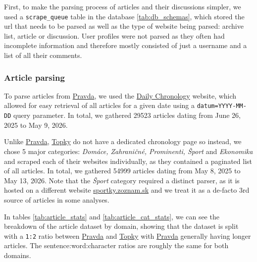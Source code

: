 \documentclass[11pt,a4paper]{article}
\def\topky{\href{https://topky.sk}{Topky}}
\def\pravda{\href{https://pravda.sk}{Pravda}}
\def\sportky{\href{https://sportky.zoznam.sk}{sportky.zoznam.sk}}
\begin{document}
First, to make the parsing process of articles and their discussions simpler, we used a \texttt{scrape\_queue} table in the database \ref{tab:db_schemas}, which stored the url that needs to be parsed as well as the type of website being parsed: archive list, article or discussion. User profiles were not parsed as they often had incomplete information and therefore mostly consisted of just a username and a list of all their comments.

\subsubsection{Article parsing} \label{sec:article_parsing}

To parse articles from \pravda{}, we used the \href{https://www.pravda.sk/chronologia-dna/?datum=2026-05-09}{Daily Chronology} website, which allowed for easy retrieval of all articles for a given date using a \texttt{datum=YYYY-MM-DD} query parameter. In total, we gathered 29523 articles dating from June 26, 2025 to May 9, 2026.

Unlike \pravda{}, \topky{} do not have a dedicated chronology page so instead, we chose 5 major categories: \textit{Domáce, Zahraničné, Prominenti, Šport} and \textit{Ekonomika} and scraped each of their websites individually, as they contained a paginated list of all articles. In total, we gathered 54999 articles dating from May 8, 2025 to May 13, 2026. Note that the \textit{Šport} category required a distinct parser, as it is hosted on a different website \sportky{} and we treat it as a de-facto 3rd source of articles in some analyses.

In tables \ref{tab:article_stats} and \ref{tab:article_cat_stats}, we can see the breakdown of the article dataset by domain, showing that the dataset is split with a \texttt{1:2} ratio between \pravda{} and \topky{} with \pravda{} generally having longer articles. The sentence:word:character ratios are roughly the same for both domains.
\end{document}
